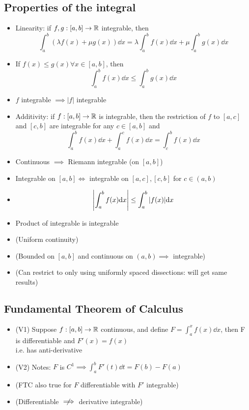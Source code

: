 \subsection*{Properties of the integral}
\begin{itemize}
      \item Linearity: if $f,g:[a,b] \to \mathbb{R}$ integrable, then \[\int_a^b (\lambda f(x) + \mu g(x)) \dd x = \lambda \int_a^b f(x) \dd x  + \mu \int_a^b g(x) \dd x \]
      \item If $f(x) \leq g(x) \forall x \in [a,b]$, then \[\int_a^b f(x) \dd x \leq \int_a^b g(x) \dd x \]
      \item $f$ integrable  $\implies |f|$ integrable
      \item Additivity: if $f:[a,b] \to \mathbb{R}$ is integrable, then the restriction of $f$ to $[a,c]$ and $[c,b]$ are integrable for any $c \in [a,b]$ and \[\int_a^b f(x) \dd x + \int_a^c f(x) \dd x = \int_c^b f(x) \dd x\]
      \item Continuous $\implies$ Riemann integrable (on $[a,b]$)
      \item Integrable on $[a,b] \iff$ integrable on $[a,c], [c,b]$ for $c \in (a,b)$
      \item \[\left| \int_a^b f(x) \mathrm{d} x \right| \leq \int_a^b |f(x)| \mathrm{d} x\]
      \item Product of integrable is integrable
      \item (Uniform continuity)
      \item (Bounded on $[a,b]$ and continuous on $(a,b) \implies$ integrable)
      \item (Can restrict to only using uniformly spaced dissections: will get same results)
\end{itemize}

\subsection*{Fundamental Theorem of Calculus}
\begin{itemize}
      \item (V1) Suppose $f: [a,b] \to \mathbb{R}$ continuous, and define $F = \int_a^x f(x) \dd x$, then F is differentiable and $F'(x) = f(x)$ \\ i.e. has anti-derivative
      \item (V2) Notes: $F$ is $C^1 \implies \int_a^b F'(t) \dd t = F(b) - F(a)$
      \item (FTC also true for $F$ differentiable with $F'$ integrable)
      \item (Differentiable $\centernot\implies$ derivative integrable)
\end{itemize}

